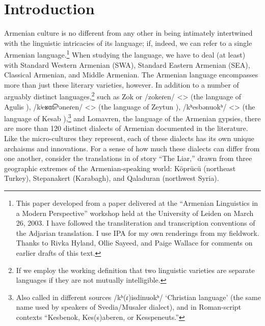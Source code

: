 \section{Introduction}


Armenian culture is no different from any other in being intimately intertwined with the linguistic intricacies of its language; if, indeed, we can refer to a single Armenian language.\footnote{This paper developed from a paper delivered at the ``Armenian Linguistics in a Modern Perspective'' workshop held at the University of Leiden on March 26, 2003. I have followed the transliteration and transcription conventions of the Adjarian translation. I use IPA for my own renderings from my fieldwork. Thanks to Rivka Hyland, Ollie Sayeed, and Paige Wallace for comments on earlier drafts of this text.} When studying the language, we have to deal (at least) with Standard Western Armenian (SWA), Standard Eastern Armenian (SEA), Classical Armenian, and Middle Armenian.  The Armenian language encompasses more than just these literary varieties, however.  In addition to a number of arguably distinct languages,\footnote{If we employ the working definition that two linguistic varieties are separate languages if they are not mutually intelligible. } such as   Zok or /zokeɾen/ <> (the language of Agulis ),  /kʲeʁɑt͡sʰǝneɾen/ <> (the language of Zeytun ),  /kʰesbǝnuokʰ/ <> (the language of Kesab ),\footnote{  Also called in different sources /kʰ(ɾ)isdinuokʰ/ `Christian language' (the same name used by speakers of Svedia/Musaler dialect), and in Roman-script contexts ``Kesbenok,  Kes(s)aberen, or Kesspeneuts.''} and Lomavren, the language of the Armenian gypsies, there are more than 120 distinct dialects of Armenian documented in the literature.  Like the micro-cultures they represent, each of these dialects has its own unique archaisms and innovations.  For a sense of how much these dialects can differ from one another, consider the translations in  of  story ``The Liar,''  drawn from three geographic extremes of the Armenian-speaking world: Köprücü (northeast Turkey), Stepanakert (Karabagh), and Qaladuran (northwest Syria).

